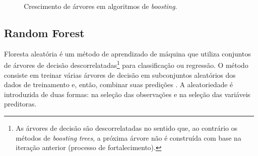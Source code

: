 \documentclass[
  12pt,
  twoside,
  openright,
  a4paper,
  chapter=TITLE,
  section=TITLE,
  brazil]{abntex2}
\begin{document}
\begin{apendicesenv}
\begin{figure}

\begin{minipage}{\linewidth}



\end{minipage}%
\newline
\begin{minipage}{\linewidth}



\end{minipage}%

\caption{\label{fig-tree-growth}Crescimento de árvores em algoritmos de
\emph{boosting}.}

\end{figure}%

\subsection{Random Forest}\label{random-forest}

Floresta aleatória é um método de aprendizado de máquina que utiliza
conjuntos de árvores de decisão descorrelatadas\footnote{As árvores de
  decisão são descorrelatadas no sentido que, ao contrário os métodos de
  \emph{boosting trees}, a próxima árvore não é construída com base na
  iteração anterior (processo de fortalecimento).} para classificação ou
regressão. O método consiste em treinar várias árvores de decisão em
subconjuntos aleatórios dos dados de treinamento e, então, combinar suas
predições \autocite{hastie_elements_2009}. A aleatoriedade é introduzida
de duas formas: na seleção das observações e na seleção das variáveis
preditoras.


\end{apendicesenv}
\end{document}
